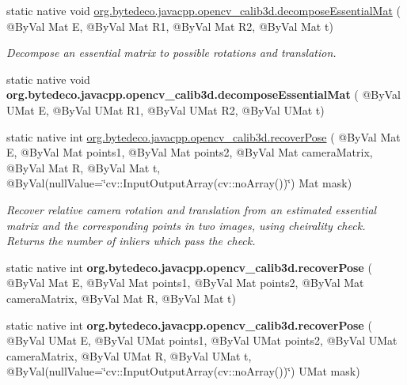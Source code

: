 \begin{DoxyCompactItemize}
static native void \hyperlink{group__calib3d_ga314b8ffe22b285bacf23b671e27d4495}{org.\+bytedeco.\+javacpp.\+opencv\+\_\+calib3d.\+decompose\+Essential\+Mat} ( @By\+Val Mat E, @By\+Val Mat R1, @By\+Val Mat R2, @By\+Val Mat t)
\begin{DoxyCompactList}\small\item\em Decompose an essential matrix to possible rotations and translation. \end{DoxyCompactList}\item 
\mbox{\label{group__calib3d_ga5dc6dfa66a16bcc78e72e44b326ab6a3}} 
static native void {\bfseries org.\+bytedeco.\+javacpp.\+opencv\+\_\+calib3d.\+decompose\+Essential\+Mat} ( @By\+Val U\+Mat E, @By\+Val U\+Mat R1, @By\+Val U\+Mat R2, @By\+Val U\+Mat t)
\item 
static native int \hyperlink{group__calib3d_gad7bafb76a3a077aa3ce1e3b98d475311}{org.\+bytedeco.\+javacpp.\+opencv\+\_\+calib3d.\+recover\+Pose} ( @By\+Val Mat E, @By\+Val Mat points1, @By\+Val Mat points2, @By\+Val Mat camera\+Matrix, @By\+Val Mat R, @By\+Val Mat t, @By\+Val(null\+Value=\char`\"{}cv\+::\+Input\+Output\+Array(cv\+::no\+Array())\char`\"{}) Mat mask)
\begin{DoxyCompactList}\small\item\em Recover relative camera rotation and translation from an estimated essential matrix and the corresponding points in two images, using cheirality check. Returns the number of inliers which pass the check. \end{DoxyCompactList}\item 
\mbox{\label{group__calib3d_ga6be6b89cdf5bd14da1432494a5226bbf}} 
static native int {\bfseries org.\+bytedeco.\+javacpp.\+opencv\+\_\+calib3d.\+recover\+Pose} ( @By\+Val Mat E, @By\+Val Mat points1, @By\+Val Mat points2, @By\+Val Mat camera\+Matrix, @By\+Val Mat R, @By\+Val Mat t)
\item 
\mbox{\label{group__calib3d_ga494775a1a8d0308141e8266ea4d77c54}} 
static native int {\bfseries org.\+bytedeco.\+javacpp.\+opencv\+\_\+calib3d.\+recover\+Pose} ( @By\+Val U\+Mat E, @By\+Val U\+Mat points1, @By\+Val U\+Mat points2, @By\+Val U\+Mat camera\+Matrix, @By\+Val U\+Mat R, @By\+Val U\+Mat t, @By\+Val(null\+Value=\char`\"{}cv\+::\+Input\+Output\+Array(cv\+::no\+Array())\char`\"{}) U\+Mat mask)
\item 
\mbox{\label{group__calib3d_gae066033cb1e9f6d944415901cef4acdd}} 

\end{DoxyCompactItemize}
